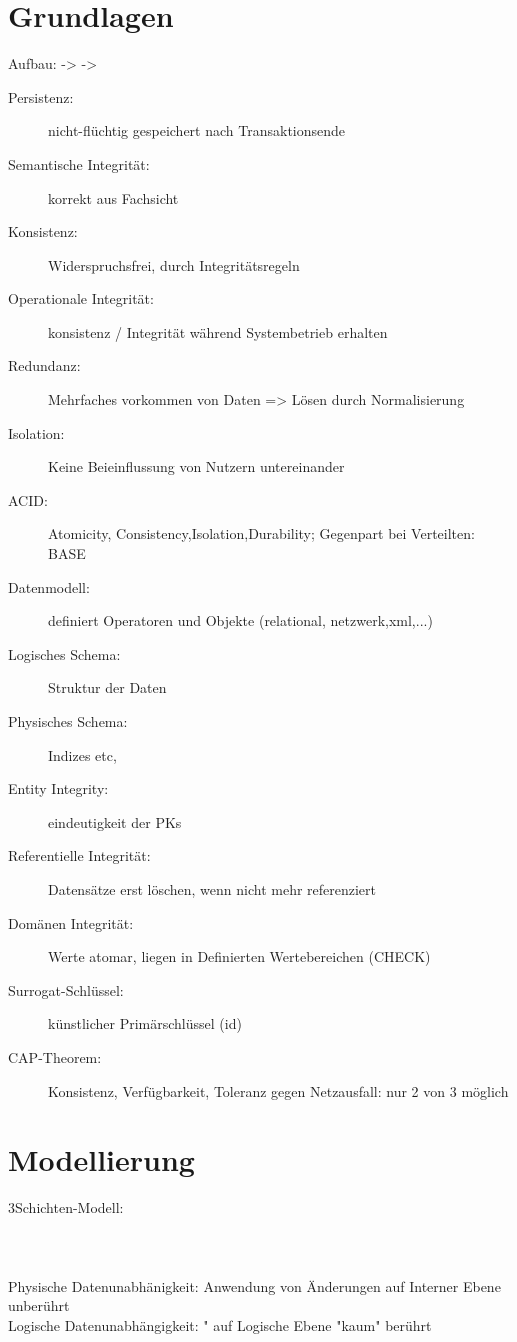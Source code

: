 \section*{Grundlagen}
Aufbau:  ->  -> 

\begin{description}
\item[Persistenz:] nicht-flüchtig gespeichert nach Transaktionsende
\item[Semantische Integrität:] korrekt aus Fachsicht 
\item[Konsistenz:] Widerspruchsfrei, durch Integritätsregeln
\item[Operationale Integrität:] konsistenz / Integrität während Systembetrieb erhalten
\item[Redundanz:] Mehrfaches vorkommen von Daten => Lösen durch Normalisierung
\item[Isolation:] Keine Beieinflussung von Nutzern untereinander
\item[ACID:] Atomicity, Consistency,Isolation,Durability; Gegenpart bei Verteilten: BASE
\item[Datenmodell:] definiert Operatoren und Objekte (relational, netzwerk,xml,...)
\item[Logisches Schema:] Struktur der Daten
\item[Physisches Schema:] Indizes etc,
\item[Entity Integrity:] eindeutigkeit der PKs
\item[Referentielle Integrität:] Datensätze erst löschen, wenn nicht mehr referenziert
\item[Domänen Integrität:] Werte atomar, liegen in Definierten Wertebereichen (CHECK)
\item[Surrogat-Schlüssel:] künstlicher Primärschlüssel (id)
\item[ CAP-Theorem:] Konsistenz, Verfügbarkeit, Toleranz gegen Netzausfall: nur 2 von 3 möglich

\end{description}

\section*{Modellierung}

3Schichten-Modell: \\
 \\ \\\\
Physische Datenunabhänigkeit: Anwendung von Änderungen auf Interner Ebene unberührt\\
Logische Datenunabhängigkeit: " auf Logische Ebene "kaum" berührt

